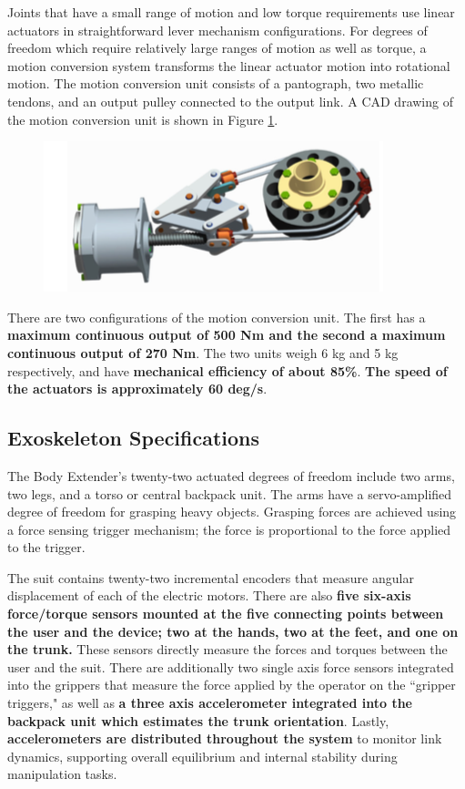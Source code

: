  Joints that have a small range of motion and low torque requirements use linear actuators in straightforward lever mechanism configurations.  For degrees of freedom which require relatively large ranges of motion as well as torque, a motion conversion system transforms the linear actuator motion into rotational motion.  The motion conversion unit consists of a pantograph, two metallic tendons, and an output pulley connected to the output link.  A CAD drawing of the motion conversion unit is shown in Figure \ref{fig:motionConv}. 
 \begin{figure}[thpb]
\centering
\includegraphics[width=3.in]{exos/figs/bodyExt/motionConv}
  \caption{}
 \label{fig:motionConv}   
 \end{figure}
 There are two configurations of the motion conversion unit.  The first has a {\bf maximum continuous output of 500 Nm and the second a maximum continuous output of 270 Nm}.  The two units weigh 6 kg and 5 kg respectively, and have {\bf mechanical efficiency of about 85\%}.  {\bf The speed of the actuators is approximately 60 deg/s}.
 
 
 \subsection{Exoskeleton Specifications}
 
 The Body Extender's twenty-two actuated degrees of freedom include two arms, two legs, and a torso or central backpack unit.   The arms have a servo-amplified degree of freedom for grasping heavy objects.  Grasping forces are achieved using a force sensing trigger mechanism; the force is proportional to the force applied to the trigger.
 
 The suit contains twenty-two incremental encoders that measure angular displacement of each of the electric motors.  There are also {\bf five six-axis force/torque sensors mounted at the five connecting points between the user and the device; two at the hands, two at the feet, and one on the trunk.}  These sensors directly measure the forces and torques between the user and the suit.  There are additionally two single axis force sensors integrated into the grippers that measure the force applied by the operator on the ``gripper triggers," as well as {\bf a three axis accelerometer integrated into the backpack unit which estimates the trunk orientation}.  Lastly, \textbf{accelerometers are distributed throughout the system} to monitor link dynamics, supporting overall equilibrium and internal stability during manipulation tasks.   
 
